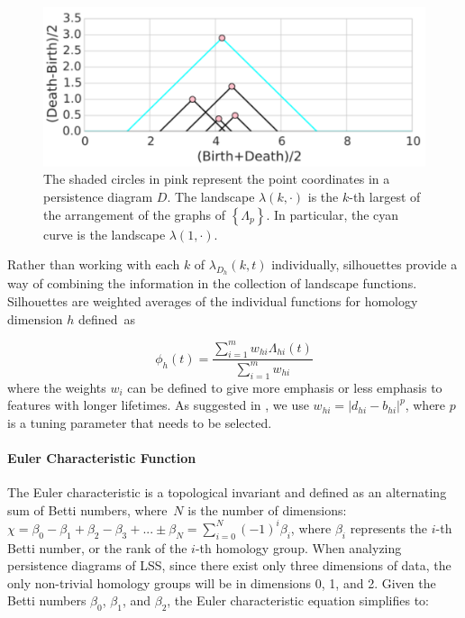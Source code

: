 \documentclass[12pt]{article}
\begin{document}
\begin{center}
\begin{figure}[htp!]
  \centering
  \includegraphics[width=0.5\linewidth]{example_landscape.pdf}
    \caption{ The shaded circles in pink represent the point coordinates in a persistence diagram $D$. The landscape $\lambda(k, \cdot)$ is the $k$-th largest of the arrangement of the graphs of $\left \{ \Lambda_{p} \right \}$. In particular, the cyan curve is the landscape $\lambda(1, \cdot)$.}
    \label{fig:landscape}
\end{figure}
\end{center}

Rather than working with each $k$ of $\lambda_{D_h}(k, t)$ individually, silhouettes provide a way of combining the information in the collection of landscape functions.  Silhouettes are weighted averages of the individual functions for homology dimension $h$ defined~as

\begin{equation*}
\phi_h(t) = \frac{\sum_{i = 1}^mw_{hi}\Lambda_{hi}(t)}{\sum_{i = 1}^mw_{hi}}
\end{equation*}
where the weights $w_i$ can be defined to give more emphasis or less emphasis to features with longer lifetimes.  As suggested in \cite{chazal2014stochastic}, we use $w_{hi} = |d_{hi} - b_{hi}|^p$, where $p$ is a tuning parameter that needs to be selected.

\paragraph{Euler Characteristic Function}
The Euler characteristic is a topological invariant and defined as an alternating sum of Betti numbers, where~$N$ is the number of dimensions: $\chi = \beta_{0} - \beta_{1} + \beta_{2} - \beta_{3} + ... \pm \beta_N = \sum_{i=0}^{N} (-1)^{i} \beta_{i}$,
where $\beta_{i}$ represents the $i$-th Betti number, or the rank of the $i$-th homology group. When analyzing persistence diagrams of LSS, since there exist only three dimensions of data, the only non-trivial homology groups will be in dimensions 0, 1, and 2. Given the Betti numbers $\beta_{0}$, $\beta_{1}$, and $\beta_{2}$, the Euler characteristic equation simplifies to:
\end{document}
